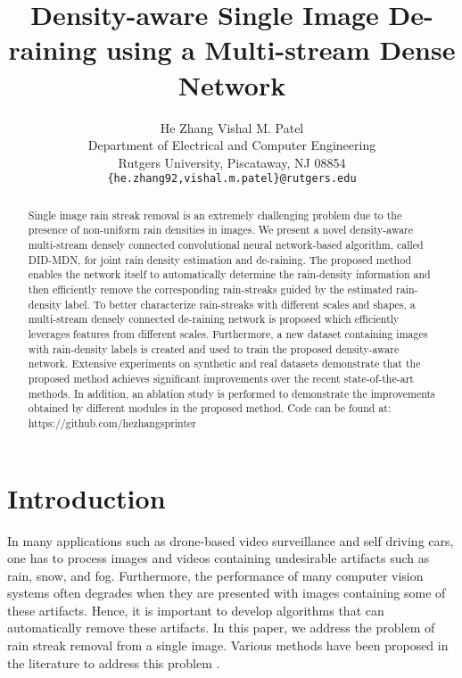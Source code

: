 \documentclass[10pt,twocolumn,letterpaper]{article}
\begin{document}
\title{Density-aware Single Image De-raining using a Multi-stream  Dense Network}

\author{He  Zhang \qquad \qquad \qquad Vishal M. Patel \\
Department of Electrical and Computer Engineering\\Rutgers University, Piscataway, NJ 08854
\\
{\tt\small {\{he.zhang92,vishal.m.patel\}}@rutgers.edu}
}

    \setlength\abovedisplayskip{0pt}
    \setlength\belowdisplayskip{0pt}

\maketitle



\begin{abstract}
Single image rain streak removal is an extremely challenging problem due to the presence of non-uniform rain densities in images.   We present a novel density-aware multi-stream densely connected convolutional neural network-based algorithm, called DID-MDN, for joint rain density estimation and de-raining.    The proposed method enables the network itself to automatically determine the rain-density information and then efficiently remove the corresponding rain-streaks guided by the estimated rain-density label. To  better characterize rain-streaks with different scales and shapes,  a  multi-stream densely connected de-raining network is proposed which efficiently leverages features from different scales. Furthermore, a new dataset containing  images with rain-density labels is created and used to train the proposed density-aware network. Extensive experiments on synthetic and real datasets demonstrate that the proposed method achieves significant improvements over the  recent state-of-the-art methods.  In addition, an ablation study is performed to demonstrate the improvements obtained by different modules in the proposed method. Code can be found at: https://github.com/hezhangsprinter
\end{abstract}





\section{Introduction}
\label{sec:introduction}
In many applications such as drone-based video surveillance and self driving cars, one has to process images and videos containing undesirable artifacts such  as  rain,  snow,  and  fog.   Furthermore, the performance of many computer vision systems often degrades when they are presented with images containing some of these artifacts.  Hence, it is important to develop algorithms that can automatically remove these artifacts.   In this paper, we address the problem of rain streak removal from a single image.  Various methods have been proposed in the literature to address this problem \cite{rain_2016_gmm,derain_cvpr2017,derain_csc_17,dis_rain_2015,derain_lowrank,derain_tip12,derain_tip14,derain_depth_sparse,derain_2017_zhang,derain_cvpr2017_multi,derain_tip17}.
\end{document}

